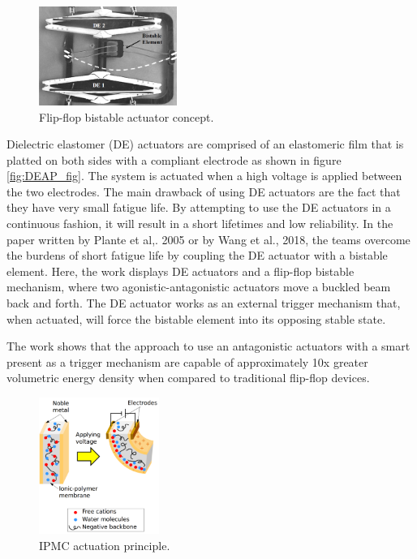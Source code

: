 \begin{figure}
	\centering
	\vspace{20pt}
	\includegraphics[width=0.4\textwidth]{Figures/DEAP_flipflop.png}
	\caption{Flip-flop bistable actuator concept\cite{plante_compliant_2005}.}
	\label{fig:DEAP_flipflop}
\end{figure}

Dielectric elastomer (DE) actuators are comprised of an elastomeric film that is platted on both sides with a compliant electrode as shown in figure \ref{fig:DEAP_fig}. The system is actuated when a high voltage is applied between the two electrodes. The main drawback of using DE actuators are the fact that they have very small fatigue life. By attempting to use the DE actuators in a continuous fashion, it will result in a short lifetimes and low reliability. In the paper written by Plante et al,. 2005\cite{plante_properties_2007,chouinard_bistable_2012} or by Wang et al., 2018\cite{wang_design_2018}, the teams overcome the burdens of short fatigue life by coupling the DE actuator with a bistable element. Here, the work displays DE actuators and a flip-flop bistable mechanism, where two agonistic-antagonistic actuators move a buckled beam back and forth. The DE actuator works as an external trigger mechanism that, when actuated, will force the bistable element into its opposing stable state.

The work shows that the approach to use an antagonistic actuators with a smart present as a trigger mechanism are capable of approximately 10x greater volumetric energy density when compared to traditional flip-flop devices.\\

\begin{figure}
	\centering
	\vspace{-20pt}
	\includegraphics[width=0.35\textwidth]{Figures/IPMC_fig.png}
	\caption{IPMC actuation principle\cite{poubel_proposal_2011}.}
	\vspace{-15pt}
	\label{fig:IPMC_act}
\end{figure}

